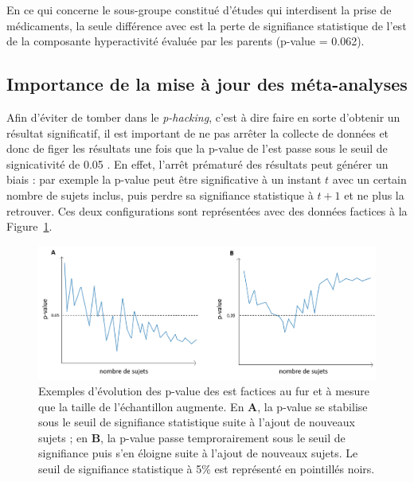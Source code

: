 \begin{itemize}
En ce qui concerne le sous-groupe constitué d'études qui interdisent la prise de médicaments, la seule différence avec \citep{Cortese2016} est la perte de   
signifiance statistique de l'\gls{est} de la composante hyperactivité évaluée par les parents (p-value = 0.062).

\subsection{Importance de la mise à jour des méta-analyses} \label{need_to_update_meta_analysis}

Afin d'éviter de tomber dans le \textit{p-hacking}, c'est à dire faire en sorte d'obtenir un résultat significatif, il est important de ne pas arrêter la collecte de données 
et donc de figer les résultats une fois que la p-value de l'\gls{est} passe sous le seuil de signicativité de 0.05 \citep{Head2015, Coffman2015}. En effet, l'arrêt prématuré des résultats peut
générer un biais : par exemple la p-value peut être significative à un instant $t$ avec un certain nombre de sujets inclus, puis perdre sa signifiance statistique à
$t + 1$ et ne plus la retrouver. Ces deux configurations sont représentées avec des données factices à la Figure~\ref{Figure:meta-analysis-evolution-p-value-examples}.

\begin{figure}[h!]
  \centering
	\includegraphics[width=1\linewidth]{figures/chapter-2/meta-analysis-evolution-p-value-examples} 
  \caption{Exemples d'évolution des p-value des \gls{est} factices au fur et à mesure que la taille de l'échantillon augmente. 
	En \textbf{A}, la p-value se stabilise sous le seuil de signifiance statistique suite à l'ajout de nouveaux sujets ; en \textbf{B}, la p-value 
	passe temprorairement sous le seuil de signifiance puis s'en éloigne suite à l'ajout de nouveaux sujets. 
	Le seuil de signifiance statistique à 5\% est représenté en pointillés noirs.}
  \label{Figure:meta-analysis-evolution-p-value-examples}
\end{figure}


\end{itemize}
